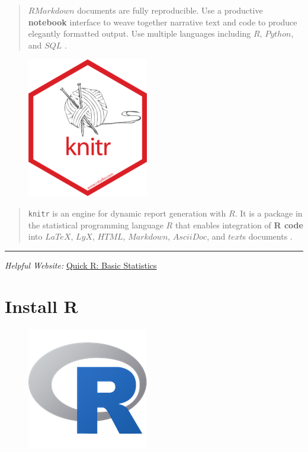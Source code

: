 \documentclass[]{book}
\begin{document}
\begin{quote}
\(R Markdown\) documents are fully reproducible. Use a productive
\textbf{notebook} interface to weave together narrative text and code to
produce elegantly formatted output. Use multiple languages including
\(R\), \(Python\), and \(SQL\) \citep{R-rmarkdown}.
\end{quote}

\begin{figure}
\centering
\includegraphics{images/hex/knitr-200x232.png}
\caption{}
\end{figure}

\begin{quote}
\texttt{knitr} is an engine for dynamic report generation with \(R\). It
is a package in the statistical programming language \(R\) that enables
integration of \textbf{R code} into \(LaTeX\), \(LyX\), \(HTML\),
\(Markdown\), \(AsciiDoc\), and \(text\)s documents \citep{R-knitr}.
\end{quote}

\begin{center}\rule{0.5\linewidth}{\linethickness}\end{center}

\begin{rmdtip}
\emph{Helpful Website:}
\href{https://www.statmethods.net/stats/index.html}{Quick R: Basic
Statistics}
\end{rmdtip}

\chapter{Install R}\label{install-r}

\begin{figure}
\centering
\includegraphics{images/Rlogo_200.png}
\caption{}
\end{figure}
\end{document}
